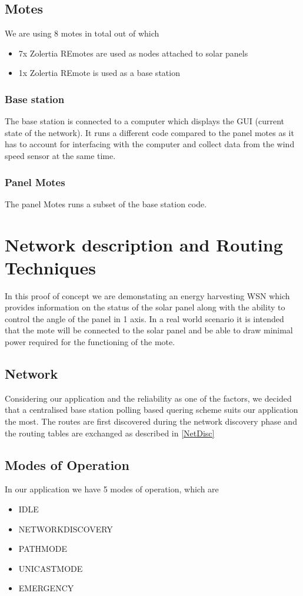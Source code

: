 \documentclass[conference]{IEEEtran}
\begin{document}
\subsection{Motes}
We are using 8 motes in total out of which
\begin{itemize}
    \item 7x Zolertia REmotes are used as nodes attached to solar panels
    \item 1x Zolertia REmote is used as a base station
\end{itemize}

\subsubsection{Base station}
    The base station is connected to a computer which displays the GUI (current state of the network). It runs a different code compared to the panel motes as it has to account for interfacing with the computer and collect data from the wind speed sensor at the same time.
\subsubsection{Panel Motes}
    The panel Motes runs a subset of the base station code.

\section{Network description and Routing Techniques}
In this proof of concept we are demonstating an energy harvesting WSN which provides information on the status of the solar panel along with the ability to control the angle of the panel in 1 axis. In a real world scenario it is intended that the mote\cite{REmote} will be connected to the solar panel and be able to draw minimal power required for the functioning of the mote.
\subsection{Network}
Considering our application and the reliability as one of the factors, we decided that a centralised base station polling based quering scheme suits our application the most. The routes are first discovered during the network discovery phase and the routing tables are exchanged as described in \ref{NetDisc}

\subsection{Modes of Operation}
In our application we have 5 modes of operation, which are
\begin{itemize}
    \item IDLE
    \item NETWORKDISCOVERY
    \item PATHMODE
    \item UNICASTMODE
    \item EMERGENCY
\end{itemize}
\end{document}
